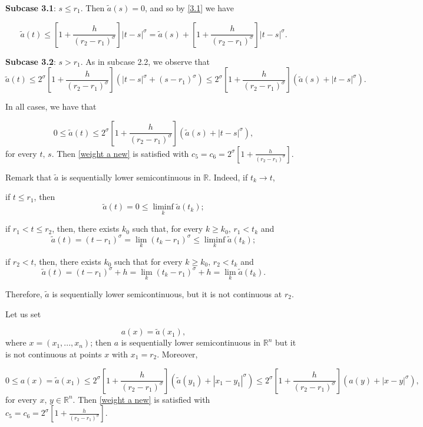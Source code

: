 \documentclass[a4paper,10pt]{article}
\theoremstyle{plain}
\theoremstyle{definition}
\numberwithin{equation}{section} \makeatletter
\begin{document}
\noindent
{\bf Subcase 3.1}: $s \leq r_1$. Then $\tilde{a}(s)=0$, and so by \eqref{3.1} we have

$$
\tilde{a}(t) \leq \left [ 1+\frac{h}{(r_2 - r_1)^\sigma} \right ]|t-s|^\sigma = \tilde{a}(s) + \left [ 1+\frac{h}{(r_2 - r_1)^\sigma} \right ]|t-s|^\sigma. 
$$

\noindent
{\bf Subcase 3.2}: $s > r_1$. As in subcase 2.2, we observe that
$$
\tilde{a}(t) \leq  2^\sigma \left [ 1+\frac{h}{(r_2 - r_1)^\sigma} \right ] (|t-s|^\sigma + (s-r_1)^\sigma) \leq  2^\sigma \left [ 1+\frac{h}{(r_2 - r_1)^\sigma} \right ] (\tilde{a}(s)+|t-s|^\sigma ).
$$ 

\noindent
In all cases, we have that 

$$
0\le \tilde{a}(t)\le  2^\sigma \left [ 1+\frac{h}{(r_2 - r_1)^\sigma} \right ] (\tilde{a}(s)+|t-s|^\sigma ),
$$
for every $t,\, s$. Then \eqref{weight a new} is satisfied with $c_5=c_6= 2^\sigma \left [ 1+\frac{h}{(r_2 - r_1)^\sigma} \right ]$.



\noindent Remark that $\tilde{a}$ is sequentially lower semicontinuous in $\mathbb{R}$. Indeed, if $t_k\to t$, 

\noindent if $t \leq r_1$, 
 then 
 $$\tilde{a}(t)= 0 \leq \liminf_k \tilde{a}(t_k);$$

\noindent if $r_1 < t \leq r_2$,
 then, there exists $k_0$ such that, for every $k\ge k_0, \, r_1 <  t_k$ and
 $$\tilde{a}(t)=(t-r_1)^{\sigma}=\lim_k (t_k-r_1)^\sigma \leq \liminf_k \tilde{a}(t_k);$$

\noindent if $r_2 < t$, 
 then, there exists $k_0$ such that for every $k\ge k_0, \,  r_2 < t_k$ and 
 $$\tilde{a}(t)=(t-r_1)^\sigma+h=\lim_k (t_k-r_1)^\sigma+h=\lim_k \tilde{a}(t_k).$$

\noindent
Therefore, $\tilde{a}$ is  sequentially lower semicontinuous, but it is not continuous at $r_2$.

 
 \noindent
 Let us set

 $$
 a(x) = \tilde{a}(x_1),
 $$
 where $x=(x_1,...,x_n)$; 
 then $a$ is sequentially lower semicontinuous in $\mathbb{R}^n$ but it is not continuous at points $x$ with $x_1 = r_2$. Moreover, 

 $$
0\le a(x) = \tilde{a}(x_1)\le  2^\sigma \left [ 1+\frac{h}{(r_2 - r_1)^\sigma} \right ] (\tilde{a}(y_1)+|x_1 - y_1|^\sigma )
\leq 
2^\sigma \left [ 1+\frac{h}{(r_2 - r_1)^\sigma} \right ] ({a}(y)+|x-y|^\sigma ),
$$
for every $x,\, y \in \mathbb{R}^n$. Then \eqref{weight a new} is satisfied with $c_5=c_6= 2^\sigma \left [ 1+\frac{h}{(r_2 - r_1)^\sigma} \right ]$.
 
\end{document}
